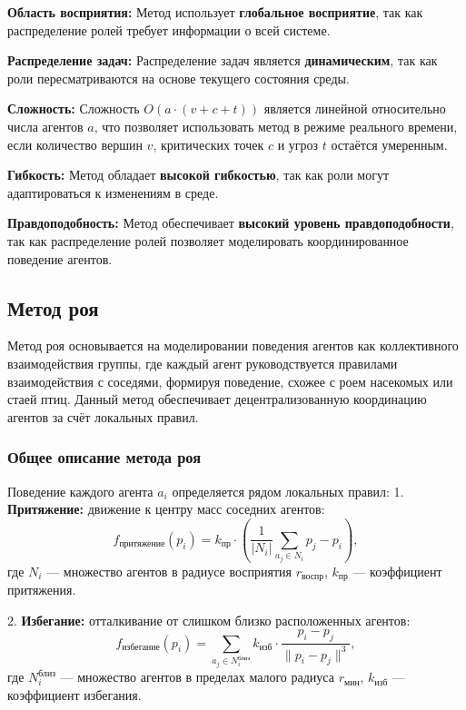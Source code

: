 \textbf{Область восприятия:}  
Метод использует \textbf{глобальное восприятие}, так как распределение ролей требует информации о всей системе.  

\textbf{Распределение задач:}  
Распределение задач является \textbf{динамическим}, так как роли пересматриваются на основе текущего состояния среды.  

\textbf{Сложность:}  
Сложность $O(a \cdot (v + c + t))$ является линейной относительно числа агентов $a$, что позволяет использовать метод в режиме реального времени, если количество вершин $v$, критических точек $c$ и угроз $t$ остаётся умеренным.  

\textbf{Гибкость:}  
Метод обладает \textbf{высокой гибкостью}, так как роли могут адаптироваться к изменениям в среде.  

\textbf{Правдоподобность:}  
Метод обеспечивает \textbf{высокий уровень правдоподобности}, так как распределение ролей позволяет моделировать координированное поведение агентов.

\subsection{Метод роя}

Метод роя основывается на моделировании поведения агентов как коллективного взаимодействия группы, где каждый агент руководствуется правилами взаимодействия с соседями, формируя поведение, схожее с роем насекомых или стаей птиц.
Данный метод обеспечивает децентрализованную координацию агентов за счёт локальных правил.

\subsubsection*{Общее описание метода роя}
Поведение каждого агента $a_i$ определяется рядом локальных правил:  
1. \textbf{Притяжение:} движение к центру масс соседних агентов:  
\begin{equation}
	f_{\text{притяжение}}(p_i) = k_{\text{пр}} \cdot \left( \frac{1}{|N_i|} \sum_{a_j \in N_i} p_j - p_i \right),
\end{equation}
где $N_i$ — множество агентов в радиусе восприятия $r_{\text{воспр}}$, $k_{\text{пр}}$ — коэффициент притяжения.

2. \textbf{Избегание:} отталкивание от слишком близко расположенных агентов:  
\begin{equation}
	f_{\text{избегание}}(p_i) = \sum_{a_j \in N_i^{\text{близ}}} k_{\text{изб}} \cdot \frac{p_i - p_j}{\|p_i - p_j\|^3},
\end{equation}
где $N_i^{\text{близ}}$ — множество агентов в пределах малого радиуса $r_{\text{мин}}$, $k_{\text{изб}}$ — коэффициент избегания.

